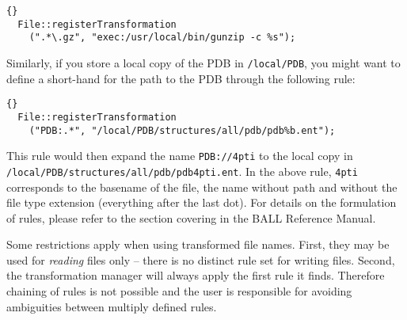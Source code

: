 \begin{lstlisting}{}
  File::registerTransformation
    (".*\.gz", "exec:/usr/local/bin/gunzip -c %s");
\end{lstlisting}

\noindent
Similarly, if you store a local copy of the PDB in {\tt /local/PDB}, you might
want to define a short-hand for the path to the PDB through the following
rule:

\begin{lstlisting}{}
  File::registerTransformation
    ("PDB:.*", "/local/PDB/structures/all/pdb/pdb%b.ent");
\end{lstlisting}

\noindent
This rule would then expand the name {\tt PDB://4pti} to the local copy
in {\tt /local/PDB/structures/all/pdb/pdb4pti.ent}. In the above rule, 
{\tt 4pti} corresponds  to the basename of the file, \ie the name without path 
and without the file type extension (everything after the last dot).
For details on the formulation of rules, please refer to the section
covering  in the BALL Reference Manual.

Some restrictions apply when using transformed file names. First, they may
be used for {\em reading} files only -- there is no distinct rule set for
writing files. Second, the transformation manager will always apply the first 
rule it finds. Therefore chaining of rules is not possible and the user
is responsible for avoiding ambiguities between multiply defined rules.

